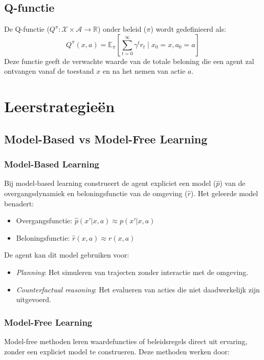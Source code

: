 \documentclass[a4paper,12pt]{report}
\begin{document}
\subsection{Q-functie}
De Q-functie (\(Q^\pi: \mathcal{X} \times \mathcal{A} \to \mathbb{R}\)) onder
beleid (\(\pi\)) wordt gedefinieerd als:
\begin{equation}
    Q^\pi(x,a) = \mathbb{E}_\pi\left[\sum_{t=0}^\infty \gamma^t r_t \mid x_0 = x, a_0 = a\right]
\end{equation}
Deze functie geeft de verwachte waarde van de totale beloning die een agent zal
ontvangen vanaf de toestand \(x\) en na het nemen van actie \(a\).

\section{Leerstrategieën}
\subsection{Model-Based vs Model-Free Learning}
\subsubsection{Model-Based Learning}
Bij model-based learning construeert de agent expliciet een model (\(\hat{p}\))
van de overgangsdynamiek en beloningsfunctie van de omgeving (\(\hat{r}\)). Het
geleerde model benadert:

\begin{itemize}
    \item Overgangsfunctie: \(\hat{p}(x'|x,a) \approx p(x'|x,a)\)
    \item Beloningsfunctie: \(\hat{r}(x,a) \approx r(x,a)\)
\end{itemize}

De agent kan dit model gebruiken voor:

\begin{itemize}
    \item \textit{Planning}: Het simuleren van trajecten zonder interactie met de omgeving.
    \item \textit{Counterfactual reasoning}: Het evalueren van acties die niet daadwerkelijk zijn uitgevoerd.
\end{itemize}

\subsubsection{Model-Free Learning}
Model-free methoden leren waardefuncties of beleidsregels direct uit ervaring,
zonder een expliciet model te construeren. Deze methoden werken door:
\end{document}

